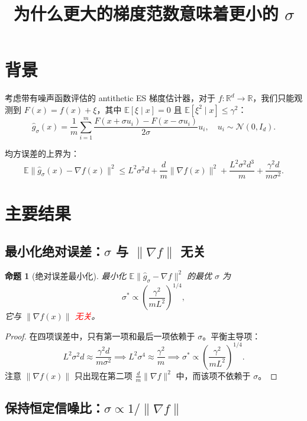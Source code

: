 \documentclass{article}
\title{为什么更大的梯度范数意味着更小的 $\sigma$}
\author{}
\date{}
\newtheorem{proposition}{命题}
\begin{document}
\maketitle

\section{背景}

考虑带有噪声函数评估的 antithetic ES 梯度估计器，对于 $f:\mathbb{R}^d\to\mathbb{R}$，我们只能观测到 $F(x) = f(x) + \xi$，其中 $\mathbb{E}[\xi\mid x]=0$ 且 $\mathbb{E}[\xi^2\mid x]\leq\gamma^2$：
\[
\widehat{g}_\sigma(x) = \frac{1}{m}\sum_{i=1}^m \frac{F(x+\sigma u_i) - F(x-\sigma u_i)}{2\sigma}u_i,
\quad u_i\sim\mathcal{N}(0,I_d).
\]

均方误差的上界为：
\[
\mathbb{E}\|\widehat{g}_\sigma(x) - \nabla f(x)\|^2
\leq
L^2\sigma^2 d + \frac{d}{m}\|\nabla f(x)\|^2 + \frac{L^2\sigma^2 d^3}{m} + \frac{\gamma^2 d}{m\sigma^2}.
\]

\section{主要结果}

\subsection{最小化绝对误差：$\sigma$ 与 $\|\nabla f\|$ 无关}

\begin{proposition}[绝对误差最小化]
最小化 $\mathbb{E}\|\widehat{g}_\sigma - \nabla f\|^2$ 的最优 $\sigma$ 为
\[
\sigma^* \propto \left(\frac{\gamma^2}{mL^2}\right)^{1/4},
\]
它与 $\|\nabla f(x)\|$ \textcolor{red}{无关}。
\end{proposition}

\begin{proof}
在四项误差中，只有第一项和最后一项依赖于 $\sigma$。平衡主导项：
\[
L^2\sigma^2 d \approx \frac{\gamma^2 d}{m\sigma^2}
\implies
L^2\sigma^4 \approx \frac{\gamma^2}{m}
\implies
\sigma^* \propto \left(\frac{\gamma^2}{mL^2}\right)^{1/4}.
\]
注意 $\|\nabla f(x)\|$ 只出现在第二项 $\frac{d}{m}\|\nabla f\|^2$ 中，而该项不依赖于 $\sigma$。
\end{proof}

\subsection{保持恒定信噪比：$\sigma \propto 1/\|\nabla f\|$}
\end{document}
